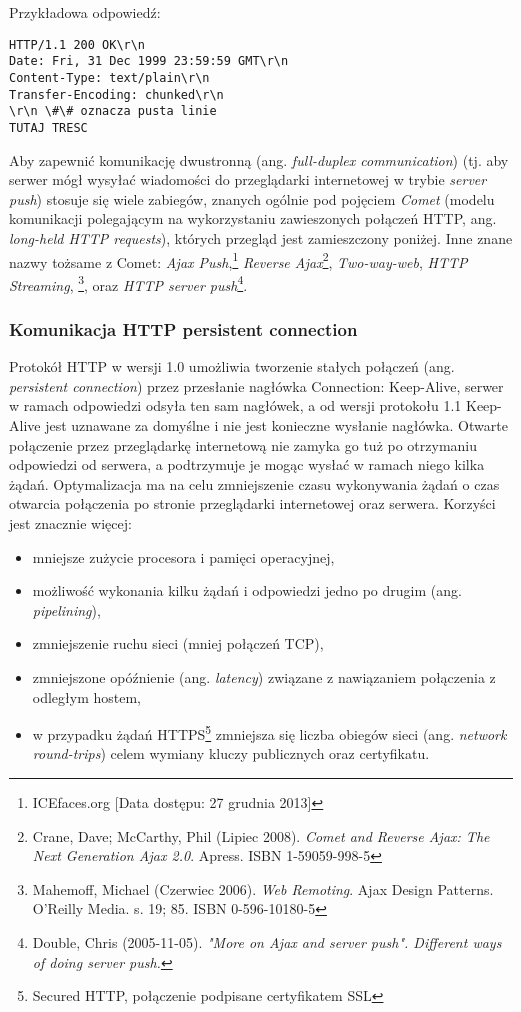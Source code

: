 Przykładowa odpowiedź:
\lstset{language=Octave}
\begin{lstlisting}
HTTP/1.1 200 OK\r\n
Date: Fri, 31 Dec 1999 23:59:59 GMT\r\n
Content-Type: text/plain\r\n
Transfer-Encoding: chunked\r\n
\r\n \#\# oznacza pusta linie
TUTAJ TRESC
\end{lstlisting}

Aby zapewnić komunikację dwustronną (ang. \emph{full-duplex communication}) (tj. aby serwer mógł wysyłać wiadomości do przeglądarki internetowej w trybie \emph{server push}) stosuje się wiele zabiegów, znanych ogólnie pod pojęciem \emph{Comet} (modelu komunikacji polegającym na wykorzystaniu zawieszonych połączeń HTTP, ang. \emph{long-held HTTP requests}), których przegląd jest zamieszczony poniżej. Inne znane nazwy tożsame z Comet: \emph{Ajax Push},\footnote{ICEfaces.org [Data dostępu: 27 grudnia 2013]} \emph{Reverse Ajax}\footnote{Crane, Dave; McCarthy, Phil (Lipiec 2008). \emph{Comet and Reverse Ajax: The Next Generation Ajax 2.0}. Apress. ISBN 1-59059-998-5}, \emph{Two-way-web}, \emph{HTTP Streaming}, \footnote{Mahemoff, Michael (Czerwiec 2006). \emph{Web Remoting}. Ajax Design Patterns. O'Reilly Media. s. 19; 85. ISBN 0-596-10180-5}, oraz \emph{HTTP server push}\footnote{Double, Chris (2005-11-05). \emph{"More on Ajax and server push". Different ways of doing server push.}}.

\subsubsection{Komunikacja HTTP persistent connection}
\label{subsub:http-persistent-connection}

Protokół HTTP w wersji 1.0 umożliwia tworzenie stałych połączeń (ang. \emph{persistent connection}) przez przesłanie nagłówka Connection: Keep-Alive, serwer w ramach odpowiedzi odsyła ten sam nagłówek, a od wersji protokołu 1.1 Keep-Alive jest uznawane za domyślne i nie jest konieczne wysłanie nagłówka. Otwarte połączenie przez przeglądarkę internetową nie zamyka go tuż po otrzymaniu odpowiedzi od serwera, a podtrzymuje je mogąc wysłać w ramach niego kilka żądań. Optymalizacja ma na celu zmniejszenie czasu wykonywania żądań o czas otwarcia połączenia po stronie przeglądarki internetowej oraz serwera. Korzyści jest znacznie więcej:

\begin{itemize}
	\item mniejsze zużycie procesora i pamięci operacyjnej,
	\item możliwość wykonania kilku żądań i odpowiedzi jedno po drugim (ang. \emph{pipelining}),
	\item zmniejszenie ruchu sieci (mniej połączeń TCP),
	\item zmniejszone opóźnienie (ang. \emph{latency}) związane z nawiązaniem połączenia z odległym hostem,
	\item w przypadku żądań HTTPS\footnote{Secured HTTP, połączenie podpisane certyfikatem SSL} zmniejsza się liczba obiegów sieci (ang. \emph{network round-trips}) celem wymiany kluczy publicznych oraz certyfikatu.
\end{itemize}

